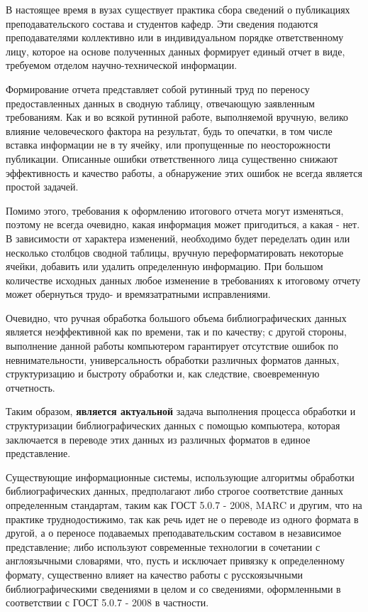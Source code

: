 \Introduction
 
В настоящее время в вузах существует практика сбора сведений о публикациях преподавательского состава и студентов кафедр. Эти сведения подаются преподавателями коллективно или в индивидуальном порядке ответственному лицу, которое на основе полученных данных формирует единый отчет в виде, требуемом отделом научно-технической информации.

Формирование отчета представляет собой рутинный труд по переносу предоставленных данных в сводную таблицу, отвечающую заявленным требованиям. Как и во всякой рутинной работе, выполняемой вручную, велико влияние человеческого фактора на результат, будь то опечатки, в том числе вставка информации не в ту ячейку, или пропущенные по неосторожности публикации. Описанные ошибки ответственного лица существенно снижают эффективность и качество работы, а обнаружение этих ошибок не всегда является простой задачей.

Помимо этого, требования к оформлению итогового отчета могут изменяться, поэтому не всегда очевидно, какая информация может пригодиться, а какая - нет. В зависимости от характера изменений, необходимо будет переделать один или несколько столбцов сводной таблицы, вручную переформатировать некоторые ячейки, добавить или удалить определенную информацию. При большом количестве исходных данных любое изменение в требованиях к итоговому отчету может обернуться трудо- и времязатратными  исправлениями.

Очевидно, что ручная обработка большого объема библиографических данных является неэффективной как по времени, так и по качеству; с другой стороны, выполнение данной работы компьютером гарантирует отсутствие ошибок по невнимательности, универсальность обработки различных форматов данных, структуризацию и быстроту обработки и, как следствие, своевременную отчетность.

Таким образом, \textbf{является актуальной} задача выполнения процесса обработки и структуризации библиографических данных с помощью компьютера, которая заключается в переводе этих данных из различных форматов в единое представление.
 
Существующие информационные системы, использующие алгоритмы обработки библиографических данных, предполагают либо строгое соответствие данных определенным стандартам, таким как ГОСТ 5.0.7 - 2008, MARC и другим, что на практике труднодостижимо, так как речь идет не о переводе из одного формата в другой, а о переносе подаваемых преподавательским составом в независимое представление; либо используют современные технологии в сочетании с англоязычными словарями, что, пусть и исключает привязку к определенному формату, существенно влияет на качество работы с русскоязычными библиографическими сведениями в целом и со сведениями, оформленными в соответствии с ГОСТ 5.0.7 - 2008 в частности.

